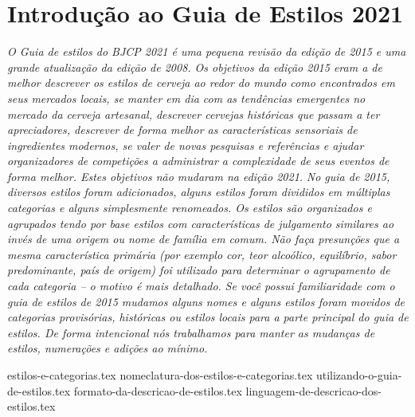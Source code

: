 \clearpage
{}
\divisorLine
\section*{Introdução ao Guia de Estilos 2021}

\textit{O Guia de estilos do BJCP 2021 é uma pequena revisão da edição de 2015 e uma grande atualização da edição de 2008. Os objetivos da edição 2015 eram a de melhor descrever os estilos de cerveja ao redor do mundo como encontrados em seus mercados locais, se manter em dia com as tendências emergentes no mercado da cerveja artesanal, descrever cervejas históricas que passam a ter apreciadores, descrever de forma melhor as características sensoriais de ingredientes modernos, se valer de novas pesquisas e referências e ajudar organizadores de competições a administrar a complexidade de seus eventos de forma melhor. Estes objetivos não mudaram na edição 2021.}
\textit{No guia de 2015, diversos estilos foram adicionados, alguns estilos foram divididos em múltiplas categorias e alguns simplesmente renomeados. Os estilos são organizados e agrupados tendo por base estilos com características de julgamento similares ao invés de uma origem ou nome de família em comum. Não faça presunções que a mesma característica primária (por exemplo cor, teor alcoólico, equilíbrio, sabor predominante, país de origem) foi utilizado para determinar o agrupamento de cada categoria – o motivo é mais detalhado.}
\textit{Se você possui familiaridade com o guia de estilos de 2015 mudamos alguns nomes e alguns estilos foram movidos de categorias provisórias, históricas ou estilos locais para a parte principal do guia de estilos. De forma intencional nós trabalhamos para manter as mudanças de estilos, numerações e adições ao mínimo.}\\

\begin{multicols}{2}

{estilos-e-categorias.tex}
{nomeclatura-dos-estilos-e-categorias.tex}
{utilizando-o-guia-de-estilos.tex}
{formato-da-descricao-de-estilos.tex}
{linguagem-de-descricao-dos-estilos.tex}

\end{multicols}